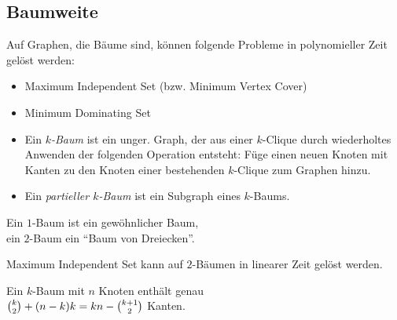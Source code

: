 \documentclass{cheat-sheet}
\begin{document}
\subsection{Baumweite}

\begin{bem}
  Auf Graphen, die Bäume sind, können folgende Probleme in polynomieller Zeit gelöst werden:
  \begin{itemize}
    \item Maximum Independent Set (bzw. Minimum Vertex Cover)
    \item Minimum Dominating Set
  \end{itemize}
\end{bem}

\begin{defn}
  \begin{itemize}
    \item
      Ein \emph{$k$-Baum} ist ein unger. Graph, der aus einer $k$-Clique durch wiederholtes Anwenden der folgenden Operation entsteht:
      Füge einen neuen Knoten mit Kanten zu den Knoten einer bestehenden $k$-Clique zum Graphen hinzu.
    \item Ein \emph{partieller $k$-Baum} ist ein Subgraph eines $k$-Baums.
  \end{itemize}
\end{defn}

\begin{bspe}
  \begin{minipage}{0.8 \linewidth}
    Ein $1$-Baum ist ein gewöhnlicher Baum, \\
    ein $2$-Baum ein "`Baum von Dreiecken"'.
  \end{minipage}
\end{bspe}

\begin{lem}
  Maximum Independent Set kann auf $2$-Bäumen in linearer Zeit gelöst werden.
\end{lem}

\begin{lem}
  \begin{minipage}[t]{0.8 \linewidth}
    Ein $k$-Baum mit $n$ Knoten enthält genau \\
    $\tbinom{k}{2} + (n-k) k = k n - \tbinom{k+1}{2}$ Kanten.
  \end{minipage}
\end{lem}
\end{document}
